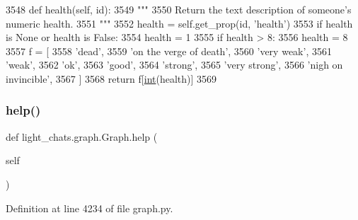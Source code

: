 \begin{DoxyCode}
3548     \textcolor{keyword}{def }health(self, id):
3549         \textcolor{stringliteral}{"""}
3550 \textcolor{stringliteral}{        Return the text description of someone's numeric health.}
3551 \textcolor{stringliteral}{        """}
3552         health = self.get\_prop(id, \textcolor{stringliteral}{'health'})
3553         \textcolor{keywordflow}{if} health \textcolor{keywordflow}{is} \textcolor{keywordtype}{None} \textcolor{keywordflow}{or} health \textcolor{keywordflow}{is} \textcolor{keyword}{False}:
3554             health = 1
3555         \textcolor{keywordflow}{if} health > 8:
3556             health = 8
3557         f = [
3558             \textcolor{stringliteral}{'dead'},
3559             \textcolor{stringliteral}{'on the verge of death'},
3560             \textcolor{stringliteral}{'very weak'},
3561             \textcolor{stringliteral}{'weak'},
3562             \textcolor{stringliteral}{'ok'},
3563             \textcolor{stringliteral}{'good'},
3564             \textcolor{stringliteral}{'strong'},
3565             \textcolor{stringliteral}{'very strong'},
3566             \textcolor{stringliteral}{'nigh on invincible'},
3567         ]
3568         \textcolor{keywordflow}{return} f[\hyperlink{namespacelanguage__model_1_1eval__ppl_a7d12ee00479673c5c8d1f6d01faa272a}{int}(health)]
3569 
\end{DoxyCode}
\mbox{\label{classlight__chats_1_1graph_1_1Graph_a6a6d39a24244430a899bbc0b752baf25}} 
\subsubsection{\texorpdfstring{help()}{help()}}
{\footnotesize\ttfamily def light\+\_\+chats.\+graph.\+Graph.\+help (\begin{DoxyParamCaption}\item[{}]{self }\end{DoxyParamCaption})}



Definition at line 4234 of file graph.\+py.


